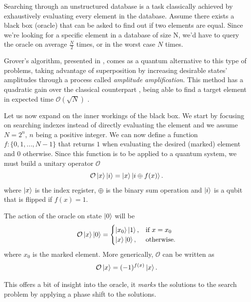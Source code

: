 \documentclass[../../dissertation.tex]{subfiles}
\begin{document}
Searching through an unstructured database is a task classically achieved by exhaustively evaluating every element in the database. Assume there exists a black box (oracle) that can be asked to find out if two elements are equal. Since we're looking for a specific element in a database of size N, we'd have to query the oracle on average $\frac{N}{2}$ times, or in the worst case $N$ times.\par
Grover's algorithm, presented in \cite{grover1996}, comes as a quantum alternative to this type of problems, taking advantage of superposition by increasing desirable states' amplitudes through a process called \textit{amplitude amplification}. This method has a quadratic gain over the classical counterpart \cite{boyer1996}, being able to find a target element in expected time $\mathcal{O}(\sqrt{N})$ .\par
Let us now expand on the inner workings of the black box. We start by focusing on searching indexes     instead of directly evaluating the element and we assume $N=2^{n}$, $n$ being a positive integer. We can now define a function $f : \{0,1,...,N-1\}$ that returns $1$ when evaluating the desired (marked) element and $0$ otherwise. Since this function is to be applied to a quantum system, we must build a unitary operator $\mathcal{O}$
\begin{equation}
	\mathcal{O}\ket{x}\ket{i} = \ket{x}\ket{i\oplus f(x)} .
\end{equation}
where $\ket{x}$ is the index register, $\oplus$ is the binary sum operation and $\ket{i}$ is a qubit that is flipped if $f(x)=1$.\par 
The action of the oracle on state $\ket{0}$ will be
\begin{equation}
	\mathcal{O}\ket{x}\ket{0} = \begin{cases} \ket{x_0}\ket{1}, & \mbox{if } x = x_0 \\ \ket{x}\ket{0}, & \mbox{otherwise.} \end{cases}
\end{equation}
where $x_0$ is the marked element. More generically, $\mathcal{O}$ can be written as
\begin{equation}
	\mathcal{O}\ket{x} = (-1)^{f(x)}\ket{x} .
\end{equation}\par
This offers a bit of insight into the oracle, it \textit{marks} the solutions to the search problem by applying a phase shift to the solutions. 
\end{document}
